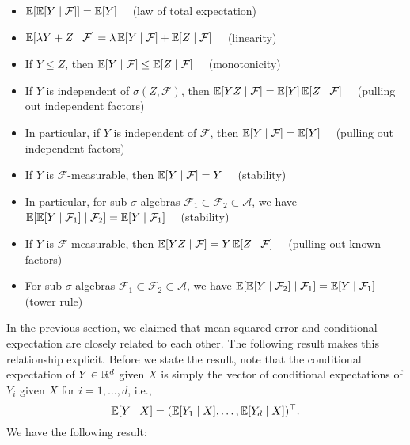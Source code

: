 \begin{itemize}
    \label{itm: properties of conditional expectation}
    \item $\operatorname{\mathbb{E}}[\operatorname{\mathbb{E}}[Y \mathrel{|} \mathcal{F}]] = \operatorname{\mathbb{E}}[Y] \quad$ (law of total expectation)

    \item $\operatorname{\mathbb{E}}[\lambda Y + Z \mathrel{|} \mathcal{F}] = \lambda \operatorname{\mathbb{E}}[Y \mathrel{|} \mathcal{F}] + \operatorname{\mathbb{E}}[Z \mathrel{|} \mathcal{F}] \quad$ (linearity)

    \item If $Y \leq Z$, then $\operatorname{\mathbb{E}}[Y \mathrel{|} \mathcal{F}] \leq \operatorname{\mathbb{E}}[Z \mathrel{|} \mathcal{F}] \quad$ (monotonicity)

    \item If $Y$ is independent of $\sigma(Z, \mathcal{F})$, then $\operatorname{\mathbb{E}}[YZ \mathrel{|} \mathcal{F}] = \operatorname{\mathbb{E}}[Y] \operatorname{\mathbb{E}}[Z \mathrel{|} \mathcal{F}] \quad$ (pulling out independent factors)
    
    \item In particular, if $Y$ is independent of $\mathcal{F}$, then $\operatorname{\mathbb{E}}[Y \mathrel{|} \mathcal{F}] = \operatorname{\mathbb{E}}[Y] \quad$ (pulling out independent factors)

    \item If $Y$ is $\mathcal{F}$-measurable, then $\operatorname{\mathbb{E}}[Y \mathrel{|} \mathcal{F}] = Y \quad$ (stability)

    \item In particular, for sub-$\sigma$-algebras $\mathcal{F}_1 \subset \mathcal{F}_2 \subset \mathcal{A}$, we have $\operatorname{\mathbb{E}}[\operatorname{\mathbb{E}}[Y \mathrel{|} \mathcal{F}_1] \mathrel{|} \mathcal{F}_2] = \operatorname{\mathbb{E}}[Y \mathrel{|} \mathcal{F}_1] \quad$ (stability)

    \item If $Y$ is $\mathcal{F}$-measurable, then $\operatorname{\mathbb{E}}[YZ \mathrel{|} \mathcal{F}] = Y \operatorname{\mathbb{E}}[Z \mathrel{|} \mathcal{F}] \quad$ (pulling out known factors)

    \item For sub-$\sigma$-algebras $\mathcal{F}_1 \subset \mathcal{F}_2 \subset \mathcal{A}$, we have $\operatorname{\mathbb{E}}[\operatorname{\mathbb{E}}[Y \mathrel{|} \mathcal{F}_2] \mathrel{|} \mathcal{F}_1] = \operatorname{\mathbb{E}}[Y \mathrel{|} \mathcal{F}_1] \quad$ (tower rule)
\end{itemize}

In the previous section, we claimed that mean squared error and conditional expectation are closely related to each other. The following result makes this relationship explicit. Before we state the result, note that the conditional expectation of $Y \in \mathbb{R}^d$ given $X$ is simply the vector of conditional expectations of $Y_i$ given $X$ for $i = 1, \dots, d$, i.e.,
\[
    \operatorname{\mathbb{E}}[Y \mathrel{|} X] = (\operatorname{\mathbb{E}}[Y_1 \mathrel{|} X], \dots, \operatorname{\mathbb{E}}[Y_d \mathrel{|} X])^{\top}.
\]
We have the following result:

